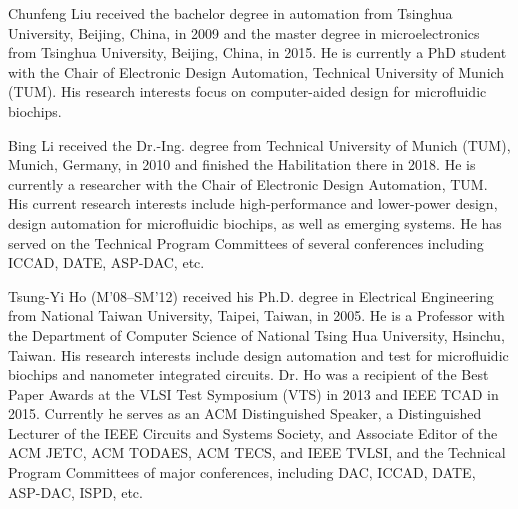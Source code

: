 \documentclass[journal,twoside]{IEEEtran}
\begin{document}
\begin{IEEEbiography}
{Chunfeng Liu} 
received the bachelor degree in automation from Tsinghua University, Beijing,
China, in 2009 and the master degree in microelectronics from Tsinghua
University, Beijing, China, in 2015. He is currently a PhD student with the Chair
of Electronic Design Automation, Technical University of Munich (TUM). His research interests focus on
computer-aided design for microfluidic biochips. 
\end{IEEEbiography}
\vskip -27.7pt
\begin{IEEEbiography}
{Bing Li} 
received the Dr.-Ing. degree from 
Technical University of Munich (TUM), Munich, Germany, in
2010 and finished the Habilitation there in 2018. He
is currently a researcher with the Chair of Electronic
Design Automation, TUM. His current research interests include high-performance and lower-power
design, design automation for microfluidic biochips,
as well as emerging systems. He has served on
the Technical Program Committees of several conferences including ICCAD, DATE,
ASP-DAC, etc.
\end{IEEEbiography}
\vskip -27.7pt
\begin{IEEEbiography}
{Tsung-Yi Ho} (M'08--SM'12) received his Ph.D. degree in Electrical Engineering from National Taiwan
University, Taipei, Taiwan, in 2005.  He is a Professor with the Department of Computer 
Science of National Tsing Hua University, Hsinchu, Taiwan. His research interests include 
design automation and test for microfluidic biochips and nanometer integrated circuits.
Dr. Ho was a recipient of the Best Paper Awards at the VLSI Test Symposium (VTS) in 2013 and IEEE
TCAD in 2015. Currently he serves as an ACM Distinguished Speaker, 
a Distinguished Lecturer of the IEEE Circuits and
Systems Society, and Associate Editor of the ACM JETC, ACM TODAES,
ACM TECS, and IEEE TVLSI, and the Technical Program Committees of
major conferences, including DAC, ICCAD, DATE, ASP-DAC, ISPD, etc.
\end{IEEEbiography}
\end{document}
